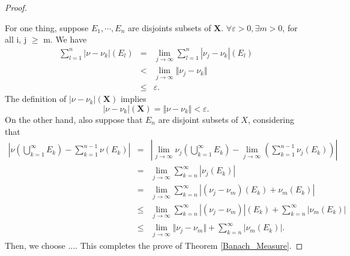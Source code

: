\documentclass[12pt]{book}
\theoremstyle{definition}
\newcommand{\X}{\mathbf{X}}
\newcommand{\Sum}[2]{{\sum_{#1}^{#2}}}
\newcommand{\Union}[2]{{\bigcup_{#1}^{#2}}}
\begin{document}
\begin{proof}
\begin{enumerate}
\end{enumerate}
For one thing, suppose $E_1,\cdots,E_n$ are disjoints subsets of $\X$. $\forall \varepsilon >0,\exists m >0$, for all i, j $\geq$ m. We have
\begin{eqnarray*}
	\Sum{l=1}{n}|\nu-\nu_k|(E_l) &=& \lim_{j \to \infty}\Sum{l=1}{n}|\nu_j-\nu_k|(E_l)\\
	&<&\lim_{j\to \infty} \Vert \nu_j - \nu_k \Vert \\
	&\leq& \varepsilon.
\end{eqnarray*}
The definition of $|\nu-\nu_k|(\X)$ implies 
$$
|\nu-\nu_k|(\X) = \Vert \nu -\nu_k \Vert < \varepsilon. 
$$
On the other hand, also suppose that $E_n$ are disjoint subsets of $X$, considering that
\begin{eqnarray*}
|\nu(\Union{k=1}{\infty}E_k)-\Sum{k=1}{n-1}\nu(E_k)| &=& |\lim_{j \to \infty}\nu_j(\Union{k=1}{\infty}E_k)-\lim_{j \to \infty}(\Sum{k=1}{n-1}\nu_j(E_k))| \\
&=& \lim_{j \to \infty}\Sum{k=n}{\infty}|\nu_j(E_k)|  \\
&=& \lim_{j \to \infty}\Sum{k=n}{\infty}|(\nu_j-\nu_m)(E_k)+\nu_m(E_k)| \\
&\leq & \lim_{j \to \infty}\Sum{k=n}{\infty}|(\nu_j-\nu_m)|(E_k)+\Sum{k=n}{\infty}|\nu_m(E_k)| \\
&\leq & \lim_{j \to \infty} \Vert \nu_j - \nu_m \Vert + \Sum{k=n}{\infty}|\nu_m(E_k)|.
\end{eqnarray*}
Then, we choose .... This completes the prove of Theorem \ref{Banach_Measure}.












\end{proof}
\end{document}
